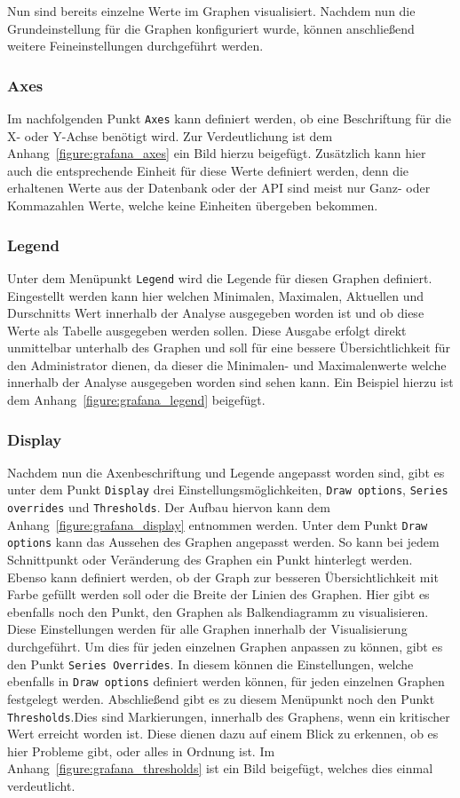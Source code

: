 Nun sind bereits einzelne Werte im Graphen visualisiert. Nachdem nun
die Grundeinstellung für die Graphen konfiguriert wurde, können anschließend
weitere Feineinstellungen durchgeführt werden.
\mr%

\subsubsection{Axes}
Im nachfolgenden Punkt \texttt{Axes} kann definiert werden, ob eine
Beschriftung für die X- oder Y\hyp{}Achse benötigt wird. Zur Verdeutlichung ist
dem Anhang~\ref{figure:grafana_axes} ein Bild hierzu beigefügt. Zusätzlich kann
hier auch die entsprechende Einheit für diese Werte definiert werden, denn die
erhaltenen Werte aus der Datenbank oder der API sind meist nur Ganz- oder
Kommazahlen Werte, welche keine Einheiten übergeben bekommen.
\mr%

\subsubsection{Legend}
Unter dem Menüpunkt \texttt{Legend} wird die Legende für diesen Graphen
definiert. Eingestellt werden kann hier welchen Minimalen, Maximalen, Aktuellen
und Durschnitts Wert innerhalb der Analyse ausgegeben worden ist und ob diese
Werte als Tabelle ausgegeben werden sollen. Diese Ausgabe erfolgt direkt
unmittelbar unterhalb des Graphen und soll für eine bessere Übersichtlichkeit
für den Administrator dienen, da dieser die Minimalen- und Maximalenwerte
welche innerhalb der Analyse ausgegeben worden sind sehen kann. Ein Beispiel
hierzu ist dem Anhang~\ref{figure:grafana_legend} beigefügt.
\mr%

\subsubsection{Display}
Nachdem nun die Axenbeschriftung und Legende angepasst worden sind, gibt es
unter dem Punkt \texttt{Display} drei Einstellungsmöglichkeiten, \texttt{Draw
options}, \texttt{Series overrides} und \texttt{Thresholds}. Der Aufbau hiervon
kann dem Anhang~\ref{figure:grafana_display} entnommen werden. Unter dem Punkt
\texttt{Draw options} kann das Aussehen des Graphen angepasst werden.  So kann
bei jedem Schnittpunkt oder Veränderung des Graphen ein Punkt hinterlegt
werden. Ebenso kann definiert werden, ob der Graph zur besseren
Übersichtlichkeit mit Farbe gefüllt werden soll oder die Breite der Linien des
Graphen. Hier gibt es ebenfalls noch den Punkt, den Graphen als Balkendiagramm
zu visualisieren. Diese Einstellungen werden für alle Graphen innerhalb der
Visualisierung durchgeführt. Um dies für jeden einzelnen Graphen anpassen zu
können, gibt es den Punkt \texttt{Series Overrides}. In diesem können die
Einstellungen, welche ebenfalls in \texttt{Draw options} definiert werden
können, für jeden einzelnen Graphen festgelegt werden. Abschließend gibt es zu
diesem Menüpunkt noch den Punkt \texttt{Thresholds}.Dies sind Markierungen,
innerhalb des Graphens, wenn ein kritischer Wert erreicht worden ist. Diese
dienen dazu auf einem Blick zu erkennen, ob es hier Probleme gibt, oder alles
in Ordnung ist. Im Anhang~\ref{figure:grafana_thresholds} ist ein Bild
beigefügt, welches dies einmal verdeutlicht.
\mr%

